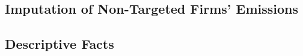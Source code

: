 %
%
%
%


\subsection{Imputation of Non-Targeted Firms' Emissions}\label{subsec:imputation}

%
%
%
%
%


\subsection{Descriptive Facts}\label{subsec:facts}

